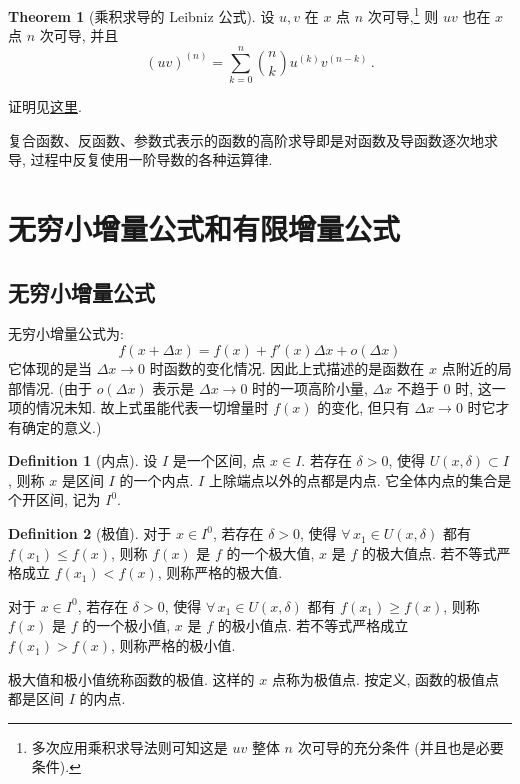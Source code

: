 \documentclass{book}
\newcommand{\Any}{\forall\,}
\renewcommand{\ge}{\geqslant}
\renewcommand{\le}{\leqslant}
\numberwithin{equation}{section}
\numberwithin{figure}{section}
\theoremstyle{definition}
\newtheorem{definition}{Definition}
\newtheorem{theorem}{Theorem}[section]
\begin{document}
\begin{theorem}[乘积求导的 Leibniz 公式]
  设 $u,v$ 在 $x$ 点 $n$ 次可导,\footnote{多次应用乘积求导法则可知这是 $uv$ 整体 $n$ 次可导的充分条件 (并且也是必要条件).} 则 $uv$ 也在 $x$ 点 $n$ 次可导, 并且 
  \begin{equation*}
    (uv)^{(n)}=\sum_{k=0}^{n}\binom{n}{k}u^{(k)}v^{(n-k)}\,.
  \end{equation*}
\end{theorem}
证明见\hyperlink{proof:deriv:Leibniz_formula}{这里}.

复合函数、反函数、参数式表示的函数的高阶求导即是对函数及导函数逐次地求导, 过程中反复使用一阶导数的各种运算律.
%
\section{无穷小增量公式和有限增量公式}
\subsection{无穷小增量公式}
无穷小增量公式为:
\begin{equation*}
  f(x+\Delta x)=f(x)+f'(x)\Delta x+o(\Delta x)
\end{equation*}
它体现的是当 $\Delta x\to0$ 时函数的变化情况. 因此上式描述的是函数在 $x$ 点附近的局部情况. (由于 $o(\Delta x)$ 表示是 $\Delta x\to0$ 时的一项高阶小量, $\Delta x$ 不趋于 0 时, 这一项的情况未知. 故上式虽能代表一切增量时 $f(x)$ 的变化, 但只有 $\Delta x\to0$ 时它才有确定的意义.)

\begin{definition}[内点]
  设 $I$ 是一个区间, 点 $x\in I$. 若存在 $\delta>0$, 使得 $U(x,\delta)\subset I$, 则称 $x$ 是区间 $I$ 的一个内点. $I$ 上除端点以外的点都是内点. 它全体内点的集合是个开区间, 记为 $I^0$.
\end{definition}

\begin{definition}[极值]
  对于 $x\in I^0$, 若存在 $\delta>0$, 使得 $\Any x_1\in U(x,\delta)$ 都有 $f(x_1)\le f(x)$, 则称 $f(x)$ 是 $f$ 的一个极大值, $x$ 是 $f$ 的极大值点. 若不等式严格成立 $f(x_1)<f(x)$, 则称严格的极大值.

  对于 $x\in I^0$, 若存在 $\delta>0$, 使得 $\Any x_1\in U(x,\delta)$ 都有 $f(x_1)\ge f(x)$, 则称 $f(x)$ 是 $f$ 的一个极小值, $x$ 是 $f$ 的极小值点. 若不等式严格成立 $f(x_1)>f(x)$, 则称严格的极小值.

  极大值和极小值统称函数的极值. 这样的 $x$ 点称为极值点. 按定义, 函数的极值点都是区间 $I$ 的内点.
\end{definition}
\end{document}

